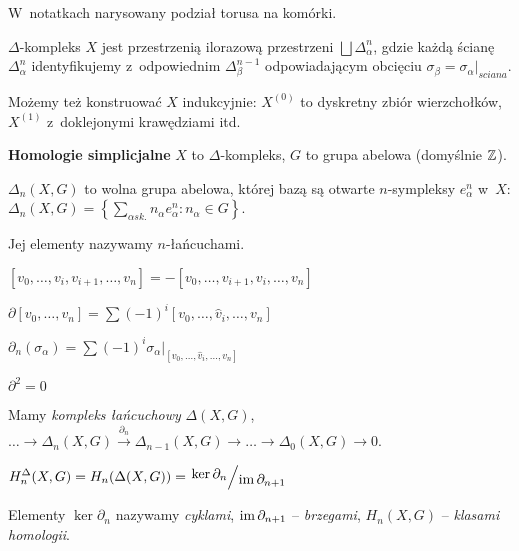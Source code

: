 \begin{przyklad}
	W~notatkach narysowany podział torusa na komórki.
\end{przyklad}

\begin{definicja}
	$\Delta$-kompleks $X$ jest przestrzenią ilorazową przestrzeni
	$\bigsqcup \Delta_\alpha^n$, gdzie każdą ścianę $\Delta_\alpha^n$
	identyfikujemy z~odpowiednim $\Delta_\beta^{n-1}$
	odpowiadającym obcięciu ${\sigma_\beta = \sigma_\alpha |_{sciana}}$.
\end{definicja}

\begin{uwaga}
	Możemy też konstruować $X$ indukcyjnie:
	$X^{(0)}$ to dyskretny zbiór wierzchołków,
	$X^{(1)}$ z~doklejonymi krawędziami itd.
\end{uwaga}
\pagebreak
{\bf Homologie simplicjalne}
$X$ to $\Delta$-kompleks, $G$ to grupa abelowa (domyślnie ${\mathbb{Z}}$).

\begin{definicja}[$n$-łańcuchy]
	$\Delta_n(X,G)$ to wolna grupa abelowa, 
	której bazą są otwarte $n$-sympleksy $e_\alpha^n$ w~$X$:
	$\Delta_n(X,G) 
	= \left\{ \sum_{\alpha sk.} n_\alpha e_\alpha^n : n_\alpha \in G \right\}$.
	
	Jej elementy nazywamy $n$-łańcuchami.
\end{definicja}

\begin{uwaga}
	$[v_0, \ldots, v_i, v_{i+1}, \ldots, v_n]
	= - [v_0, \ldots, v_{i+1}, v_i, \ldots, v_n]$
\end{uwaga}

\begin{definicja}[brzeg]
	$\partial [v_0, \ldots, v_n] 
	= \sum (-1)^i [v_0, \ldots, \hat{v}_i, \ldots, v_n]$
	
	$\partial_n(\sigma_\alpha)
	= \sum (-1)^i \sigma_\alpha |_{[v_0, \ldots, \hat{v}_i, \ldots, v_n]}$
\end{definicja}

\begin{lemat}
	$\partial^2 = 0$
\end{lemat}

\begin{definicja}
	Mamy {\em kompleks łańcuchowy} $\Delta(X,G)$, \\
	$\ldots \to \Delta_n(X, G) \xrightarrow{\partial_n}
	\Delta_{n-1}(X,G) \to \ldots \to \Delta_0(X,G) \to 0$.
\end{definicja}

\begin{definicja}
	$\displaystyle H_n^\Delta(X,G) = H_n(\Delta(X,G)) 
	= \bigslant{\ker \partial_n}{\im \partial_{n+1}}$
	
	Elementy $\ker \partial_n$ nazywamy \emph{cyklami},
	${\mathrm{im}\,} \partial_{n+1}$ -- \emph{brzegami},
	$H_n(X,G)$ -- \emph{klasami homologii}.
\end{definicja}

